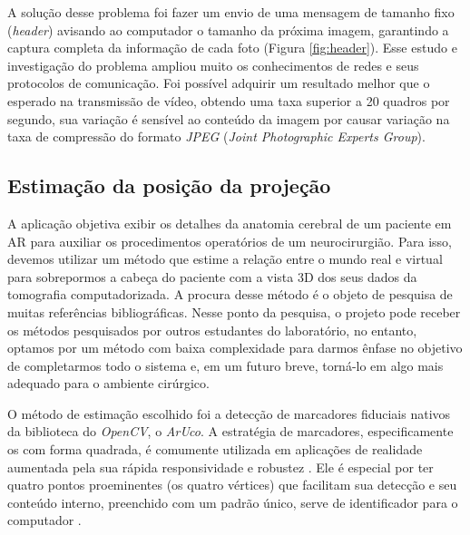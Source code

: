 

A solução desse problema foi fazer um envio de uma mensagem de tamanho fixo (\textit{header}) avisando ao computador o tamanho da próxima imagem, garantindo a captura completa da informação de cada foto (Figura \ref{fig:header}). Esse estudo e investigação do problema ampliou muito os conhecimentos de redes e seus protocolos de comunicação. Foi possível adquirir um resultado melhor que o esperado na transmissão de vídeo, obtendo uma taxa superior a 20 quadros por segundo, sua variação é sensível ao conteúdo da imagem por causar variação na taxa de compressão do formato \textit{JPEG} (\textit{Joint Photographic Experts Group}). 

\subsection{Estimação da posição da projeção}

A aplicação objetiva exibir os detalhes da anatomia cerebral de um paciente em AR para auxiliar os procedimentos operatórios de um neurocirurgião. Para isso, devemos utilizar um método que estime a relação entre o mundo real e virtual para sobrepormos a cabeça do paciente com a vista 3D dos seus dados da tomografia computadorizada. A procura desse método é o objeto de pesquisa de muitas referências bibliográficas. Nesse ponto da pesquisa, o projeto pode receber os métodos pesquisados por outros estudantes do laboratório, no entanto, optamos por um método com baixa complexidade para darmos ênfase no objetivo de completarmos todo o sistema e, em um futuro breve, torná-lo em algo mais adequado para o ambiente cirúrgico.

O método de estimação escolhido foi a detecção de marcadores fiduciais nativos da biblioteca do \textit{OpenCV}, o \textit{ArUco}. A estratégia de marcadores, especificamente os com forma quadrada, é comumente utilizada em aplicações de realidade aumentada pela sua rápida responsividade e robustez \cite{Romero-Ramirez2018}. Ele é especial por ter quatro pontos proeminentes (os quatro vértices) que facilitam sua detecção e seu conteúdo interno, preenchido com um padrão único, serve de identificador para o computador \cite{Poroykov2020}.

